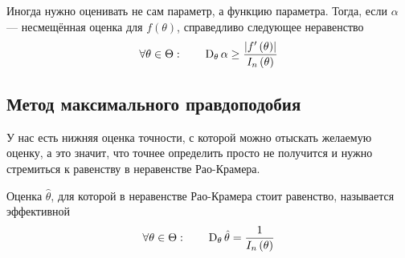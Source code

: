 \begin{remark}
  Иногда нужно оценивать не сам параметр, а функцию параметра.
  Тогда, если $\alpha$ --- несмещённая оценка для $f\left(\theta\right)$,
  справедливо следующее неравенство
  \begin{equation*}
    \forall \theta \in \Theta:\qquad
    \operatorname{D}_{\theta} \alpha
    \ge \frac{\left| f'\left( \theta \right) \right|}{I_n\left( \theta \right)}
  \end{equation*}
\end{remark}

\subsection{Метод максимального правдоподобия}
У нас есть нижняя оценка точности,
с которой можно отыскать желаемую оценку, а это значит,
что точнее определить просто не получится
и нужно стремиться к равенству в неравенстве Рао-Крамера.

\begin{definition}
  Оценка $\hat{\theta}$,
  для которой в неравенстве Рао-Крамера стоит равенство,
  называется эффективной
  \begin{equation*}
    \forall \theta \in \Theta: \qquad
    \operatorname{D}_{\theta} \hat{\theta} = \frac{1}{I_n\left( \theta \right)}
  \end{equation*}
\end{definition}

